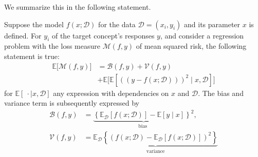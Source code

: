 \documentclass[
  journal=largetwo,
  year=2025,
  volume=37,
]{cup-journal}
\begin{document}
We summarize this in the following statement. 

\begin{theorem}
    Suppose the model $f(x;\mathcal{D})$ for the data $\mathcal{D}=(x_i, y_i)$ and its parameter $x$ is defined. For $y_{i}$ of the target concept's responses $y$, and consider a regression problem with the loss measure $\mathcal{M}(f,y)$ of mean squared risk, the following statement is true: \begin{equation}
        \begin{split}
            \mathbb{E}\big[\mathcal{M}(f,y)\big] &= \mathcal{B}(f,y) + \mathcal{V}(f,y) \\
            &+ \mathbb{E}\Big[\mathbb{E} \left[((y-f(x;\mathcal{D})))^{2}\mid x, \mathcal{D}\right]\Big]
        \end{split}
    \end{equation}
    for $\mathbb{E}[\:\cdot\mid x, \mathcal{D}]$ any expression with dependencies on $x$ and $\mathcal{D}$. The bias and variance term is subsequently expressed by 
    \begin{align}
        \mathcal{B}(f,y) &= \underbrace{\left\{ \mathbb{E}_{\mathcal{D}}[f(x;\mathcal{D})] - \mathbb{E}[y\mid x] \right\}^{2}}_{\text{bias }}, \\
        \mathcal{V}(f,y) &=\underbrace{\mathbb{E}_{\mathcal{D}} \left\{(f(x;\mathcal{D})- \mathbb{E}_{\mathcal{D}}[f(x;\mathcal{D})])^{2}\right\}}_{\text{variance}}
    \end{align}
\end{theorem}

\end{document}
